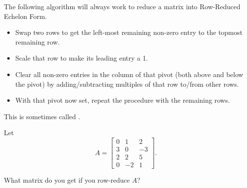 \endedxproblem

\endedxvertical







The following algorithm will always work to reduce a matrix into Row-Reduced Echelon Form.  

\begin{itemize}
\item Swap two rows to get the left-most remaining non-zero entry to the topmost remaining row.  
\item Scale that row to make its leading entry a 1.    
\item Clear all non-zero entries in the column of that pivot (both above and below the pivot) by adding/subtracting multiples of that row to/from other rows.  
\item With that pivot now set, repeat the procedure with the remaining rows.  
\end{itemize}

This is sometimes called {}.  

\endedxtext



\endedxvertical





Let 
\[
A = \left[ \begin{array}{ccc} 0 & 1 & 2 \\ 3 & 0 & -3 \\ 2 & 2 & 5 \\ 0 & -2 & 1\end{array} \right]. \]

What matrix do you get if you row-reduce $A$? 




